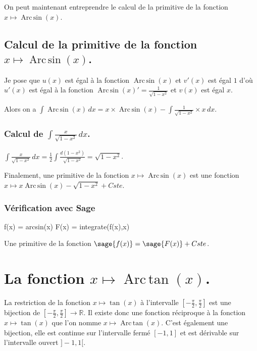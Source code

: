 \documentclass[a4paper,14pt]{extreport} %
\def\eclaire{\mathbb}
\def\R{\ensuremath{\eclaire R}}
\renewcommand{\arcsin}{\mathop{\mathrm{Arc\,sin}}}
\renewcommand{\arctan}{\mathop{\mathrm{Arc\,tan}}}
\begin{document}
On peut maintenant entreprendre le calcul de la primitive de la  fonction  $x \mapsto \arcsin(x) $.

\subsection{Calcul de la primitive de la fonction  $x \mapsto \arcsin(x) $.}


Je pose que $u(x)$  est égal à la fonction $\arcsin(x)$ et $v'(x)$ est égal $1$  d'où $u'(x)$  est égal à la fonction $\arcsin(x) ' = \frac{1}{\sqrt{1- x^2}} $ et $v(x)$ est égal $x$.

Alors on a $\int \arcsin(x) \, dx = x \times \arcsin(x) -\int \frac{1}{\sqrt{1- x^2}} \times x \, dx $.


\subsubsection{Calcul de $\int \frac{x}{\sqrt{1- x^2}} \, dx $.}

$\int \frac{x}{\sqrt{1- x^2}} \, dx = \frac{1}{2} \int \frac{d(1-x^2)}{\sqrt{1- x^2}}= \sqrt{1- x^2} $.


Finalement, une primitive de la fonction $x \mapsto \arcsin(x) $ est une fonction  $ x \mapsto x \arcsin(x) - \sqrt{1- x^2} + Cste $.

\subsubsection{Vérification avec Sage}

\begin{sageblock}
    f(x) = arcsin(x)
    F(x) = integrate(f(x),x)
\end{sageblock}

Une primitive de la fonction $\sage{f(x)} = \sage{F(x)} + Cste$.


\section{La fonction  $x \mapsto \arctan(x) $.}


La restriction de la fonction $x \mapsto \tan(x) $ à l'intervalle $\left[-\frac{\pi}{2},\frac{\pi}{2}\right]$ est une bijection de $\left[-\frac{\pi}{2},\frac{\pi}{2}\right] \rightarrow \R $. Il existe donc une fonction réciproque à la fonction $x \mapsto \tan(x) $ que l'on nomme $x \mapsto \arctan(x) $. C'est également une bijection, elle est continue sur l'intervalle fermé  $ [-1,1]$ et est dérivable sur l'intervalle ouvert $]-1,1[$.
\end{document}
